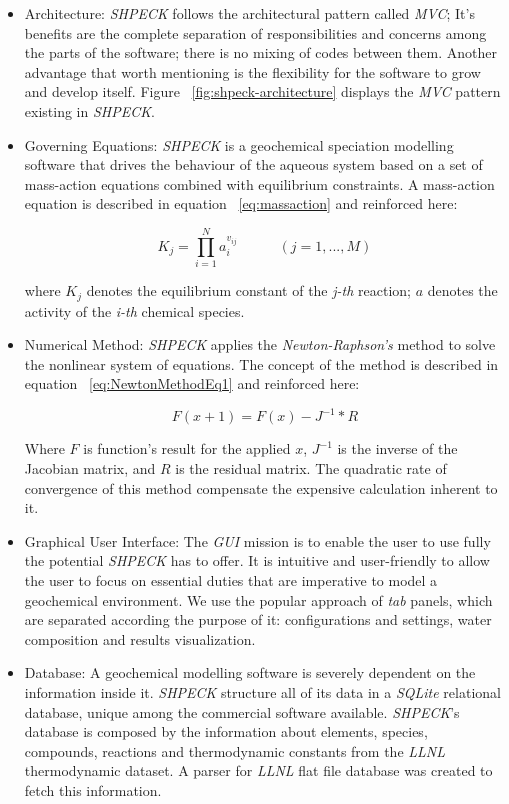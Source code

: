 \begin{itemize}
\item Architecture: \emph{SHPECK} follows the architectural pattern called \emph{MVC}; It's benefits are the complete separation of responsibilities and concerns among the parts of the software; there is no mixing of codes between them. Another advantage that worth mentioning is the flexibility for the software to grow and develop itself. Figure ~\ref{fig:shpeck-architecture} displays the \emph{MVC} pattern existing in \emph{SHPECK}.
\item Governing Equations: \emph{SHPECK} is a geochemical speciation modelling software that drives the behaviour of the aqueous system based on a set of mass-action equations combined with equilibrium constraints. A mass-action equation is described in equation  ~\ref{eq:massaction} and reinforced here:

\begin{equation}
K_j =  \prod\limits_{i=1}^N  a_i^{v_{ij}} \hspace{35pt}    (j = 1, ... , M)
\end{equation}

where $K_j$ denotes the equilibrium constant of the \emph{j-th} reaction; $a$ denotes the activity of the \emph{i-th} chemical species.

\item Numerical Method: \emph{SHPECK} applies the \emph{Newton-Raphson's} method to solve the nonlinear system of equations. The concept of the method is described in equation ~\ref{eq:NewtonMethodEq1} and reinforced here:

\begin{equation}
F(x+1) = F(x) - J^{-1} * R
\end{equation}

Where $F$ is function's result for the applied $x$, $J^{-1}$ is the inverse of the Jacobian matrix, and $R$ is the residual matrix. The quadratic rate of convergence of this method compensate the expensive calculation inherent to it.

\item Graphical User Interface: The \emph{GUI} mission is to enable the user to use fully the potential \emph{SHPECK} has to offer. It is intuitive and user-friendly to allow the user to focus on essential duties that are imperative to model a geochemical environment. We use the popular approach of \emph{tab} panels, which are separated according the purpose of it: configurations and settings, water composition and results visualization.
\item Database: A geochemical modelling software is severely dependent on the information inside it. \emph{SHPECK} structure all of its data in a \emph{SQLite} relational database, unique among the commercial software available. \emph{SHPECK}'s database is composed by the information about elements, species, compounds, reactions and thermodynamic constants from the \emph{LLNL} thermodynamic dataset. A parser for \emph{LLNL} flat file database was created to fetch this information.
\end{itemize}